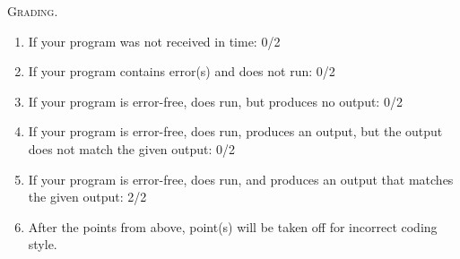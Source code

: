 \textsc{Grading.}
\begin{enumerate}
\item If your program was not received in time: 0/2
\item If your program contains error(s) and does not run: 0/2
\item If your program is error-free, does run, but produces no output: 0/2
\item If your program is error-free, does run, produces an output, but the output does not match the given output: 0/2
\item If your program is error-free, does run, and produces an output that matches
the given output: 2/2
\item After the points from above,
point(s) will be taken off for incorrect coding style.
\end{enumerate}


